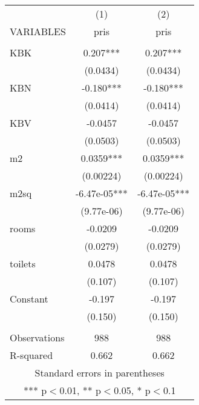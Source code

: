 \documentclass[]{article}
\begin{document}
\begin{tabular}{lcc} \hline
 & (1) & (2) \\
VARIABLES & pris & pris \\ \hline
 &  &  \\
KBK & 0.207*** & 0.207*** \\
 & (0.0434) & (0.0434) \\
KBN & -0.180*** & -0.180*** \\
 & (0.0414) & (0.0414) \\
KBV & -0.0457 & -0.0457 \\
 & (0.0503) & (0.0503) \\
m2 & 0.0359*** & 0.0359*** \\
 & (0.00224) & (0.00224) \\
m2sq & -6.47e-05*** & -6.47e-05*** \\
 & (9.77e-06) & (9.77e-06) \\
rooms & -0.0209 & -0.0209 \\
 & (0.0279) & (0.0279) \\
toilets & 0.0478 & 0.0478 \\
 & (0.107) & (0.107) \\
Constant & -0.197 & -0.197 \\
 & (0.150) & (0.150) \\
 &  &  \\
Observations & 988 & 988 \\
 R-squared & 0.662 & 0.662 \\ \hline
\multicolumn{3}{c}{ Standard errors in parentheses} \\
\multicolumn{3}{c}{ *** p$<$0.01, ** p$<$0.05, * p$<$0.1} \\
\end{tabular}
\end{document}
